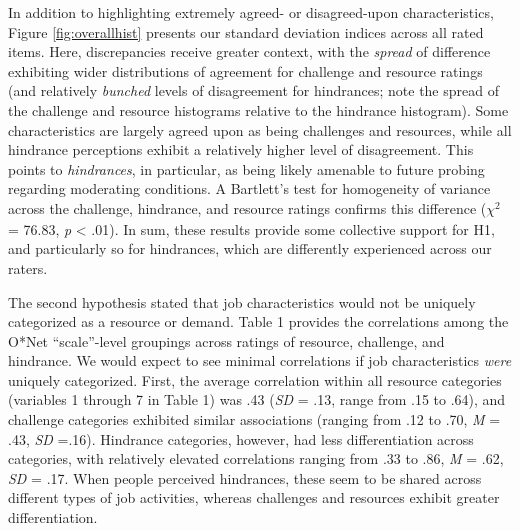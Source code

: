 \documentclass[
  man,mask]{apa7}
\begin{document}
In addition to highlighting extremely agreed- or disagreed-upon characteristics, Figure \ref{fig:overallhist} presents our standard deviation indices across all rated items. Here, discrepancies receive greater context, with the \emph{spread} of difference exhibiting wider distributions of agreement for challenge and resource ratings (and relatively \emph{bunched} levels of disagreement for hindrances; note the spread of the challenge and resource histograms relative to the hindrance histogram). Some characteristics are largely agreed upon as being challenges and resources, while all hindrance perceptions exhibit a relatively higher level of disagreement. This points to \emph{hindrances}, in particular, as being likely amenable to future probing regarding moderating conditions. A Bartlett's test for homogeneity of variance across the challenge, hindrance, and resource ratings confirms this difference (\(\chi^2_{}\) = 76.83, \emph{p} \textless{} .01). In sum, these results provide some collective support for H1, and particularly so for hindrances, which are differently experienced across our raters.

The second hypothesis stated that job characteristics would not be uniquely categorized as a resource or demand. Table 1 provides the correlations among the O*Net ``scale''-level groupings across ratings of resource, challenge, and hindrance. We would expect to see minimal correlations if job characteristics \emph{were} uniquely categorized. First, the average correlation within all resource categories (variables 1 through 7 in Table 1) was .43 (\emph{SD} = .13, range from .15 to .64), and challenge categories exhibited similar associations (ranging from .12 to .70, \emph{M} = .43, \emph{SD} =.16). Hindrance categories, however, had less differentiation across categories, with relatively elevated correlations ranging from .33 to .86, \emph{M} = .62, \emph{SD} = .17. When people perceived hindrances, these seem to be shared across different types of job activities, whereas challenges and resources exhibit greater differentiation.
\end{document}
